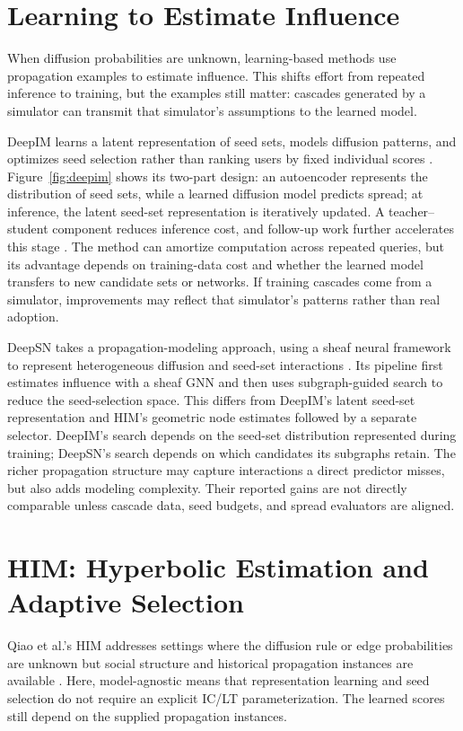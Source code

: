 \documentclass[journal]{IEEEtran}
\begin{document}
\section{Learning to Estimate Influence}
When diffusion probabilities are unknown, learning-based methods use propagation examples to estimate influence. This shifts effort from repeated inference to training, but the examples still matter: cascades generated by a simulator can transmit that simulator's assumptions to the learned model.

DeepIM learns a latent representation of seed sets, models diffusion patterns, and optimizes seed selection rather than ranking users by fixed individual scores \cite{deepim23}. Figure~\ref{fig:deepim} shows its two-part design: an autoencoder represents the distribution of seed sets, while a learned diffusion model predicts spread; at inference, the latent seed-set representation is iteratively updated. A teacher--student component reduces inference cost, and follow-up work further accelerates this stage \cite{deepim24}. The method can amortize computation across repeated queries, but its advantage depends on training-data cost and whether the learned model transfers to new candidate sets or networks. If training cascades come from a simulator, improvements may reflect that simulator's patterns rather than real adoption.

DeepSN takes a propagation-modeling approach, using a sheaf neural framework to represent heterogeneous diffusion and seed-set interactions \cite{deepsn}. Its pipeline first estimates influence with a sheaf GNN and then uses subgraph-guided search to reduce the seed-selection space. This differs from DeepIM's latent seed-set representation and HIM's geometric node estimates followed by a separate selector. DeepIM's search depends on the seed-set distribution represented during training; DeepSN's search depends on which candidates its subgraphs retain. The richer propagation structure may capture interactions a direct predictor misses, but also adds modeling complexity. Their reported gains are not directly comparable unless cascade data, seed budgets, and spread evaluators are aligned.

\section{HIM: Hyperbolic Estimation and Adaptive Selection}
Qiao et al.'s HIM addresses settings where the diffusion rule or edge probabilities are unknown but social structure and historical propagation instances are available \cite{him}. Here, model-agnostic means that representation learning and seed selection do not require an explicit IC/LT parameterization. The learned scores still depend on the supplied propagation instances.
\end{document}
